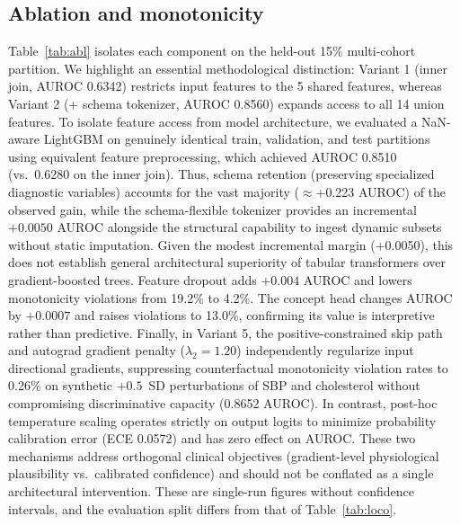 \documentclass[journal]{IEEEtran}
\begin{document}
\subsection{Ablation and monotonicity}\label{sec:ablation}
Table~\ref{tab:abl} isolates each component on the held-out 15\% multi-cohort partition. We highlight an essential methodological distinction: Variant 1 (inner join, AUROC 0.6342) restricts input features to the 5 shared features, whereas Variant 2 (+ schema tokenizer, AUROC 0.8560) expands access to all 14 union features. To isolate feature access from model architecture, we evaluated a NaN-aware LightGBM on genuinely identical train, validation, and test partitions using equivalent feature preprocessing, which achieved AUROC 0.8510 (vs.\ 0.6280 on the inner join). Thus, schema retention (preserving specialized diagnostic variables) accounts for the vast majority ($\approx$+0.223 AUROC) of the observed gain, while the schema-flexible tokenizer provides an incremental $+0.0050$ AUROC alongside the structural capability to ingest dynamic subsets without static imputation. Given the modest incremental margin (+0.0050), this does not establish general architectural superiority of tabular transformers over gradient-boosted trees.
Feature dropout adds $+0.004$ AUROC and lowers monotonicity violations from 19.2\% to 4.2\%. The concept head changes AUROC by $+0.0007$ and raises violations to 13.0\%, confirming its value is interpretive rather than predictive. Finally, in Variant 5, the positive-constrained skip path and autograd gradient penalty ($\lambda_2=1.20$) independently regularize input directional gradients, suppressing counterfactual monotonicity violation rates to 0.26\% on synthetic $+0.5$~SD perturbations of SBP and cholesterol without compromising discriminative capacity (0.8652 AUROC). In contrast, post-hoc temperature scaling operates strictly on output logits to minimize probability calibration error (ECE 0.0572) and has zero effect on AUROC. These two mechanisms address orthogonal clinical objectives (gradient-level physiological plausibility vs.\ calibrated confidence) and should not be conflated as a single architectural intervention. These are single-run figures without confidence intervals, and the evaluation split differs from that of Table~\ref{tab:loco}.
\end{document}

